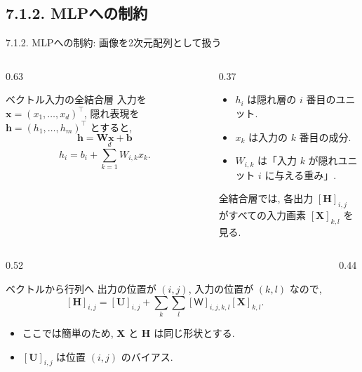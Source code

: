 \documentclass[dvipdfmx,uplatex,unicode,9pt,aspectratio=169]{beamer}
\newcommand{\X}{\mathbf{X}}
\newcommand{\Hid}{\mathbf{H}}
\newcommand{\Wten}{\mathsf{W}}
\newcommand{\U}{\mathbf{U}}
\begin{document}




\subsection{7.1.2. MLPへの制約}
\begin{frame}{7.1.2. MLPへの制約: 画像を2次元配列として扱う}
\begin{columns}[T,onlytextwidth]
\begin{column}{0.63\textwidth}
\begin{block}{ベクトル入力の全結合層}
入力を $\bm{x}=(x_1,\dots,x_d)^\top$, 隠れ表現を $\bm{h}=(h_1,\dots,h_m)^\top$ とすると,
\[
  \bm{h}=\bm{W}\bm{x}+\bm{b}
\]
\[
  h_i=b_i+\sum_{k=1}^{d}W_{i,k}x_k.
\]
\end{block}
\end{column}
\begin{column}{0.37\textwidth}
\begin{itemize}
  \item $h_i$ は隠れ層の $i$ 番目のユニット.
  \item $x_k$ は入力の $k$ 番目の成分.
  \item $W_{i,k}$ は「入力 $k$ が隠れユニット $i$ に与える重み」.
\end{itemize}
\begin{seminaralertbox}
全結合層では, 各出力 $[\Hid]_{i,j}$  がすべての入力画素 $[\X]_{k,l}$ を見る.
\end{seminaralertbox}
\end{column}
\end{columns}

\vspace{0.6em}

\begin{columns}[T,totalwidth=\textwidth]
\begin{column}{0.52\textwidth}
\begin{block}{ベクトルから行列へ}
出力の位置が $(i,j)$, 入力の位置が $(k,l)$ なので,
\[
  [\Hid]_{i,j}
  = [\U]_{i,j}
  +\sum_k\sum_l [\Wten]_{i,j,k,l}[\X]_{k,l}.
\]
\end{block}

\vspace{-0.3em}

\begin{itemize}
  \item ここでは簡単のため, $\X$ と $\Hid$ は同じ形状とする.
  \item $[\U]_{i,j}$ は位置 $(i,j)$ のバイアス.
\end{itemize}
\end{column}
\begin{column}{0.44\textwidth}
\centering
{}
\end{column}
\end{columns}
\end{frame}
\end{document}
